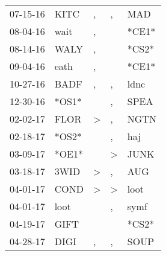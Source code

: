 \begin{supertabular}{p{0.07\textwidth}p{0.06\textwidth}p{0.02\textwidth}p{0.02\textwidth}p{0.06\textwidth}}
          07-15-16\textsuperscript{} &           KITC\textsuperscript{} &                , &                , &            MAD\textsuperscript{} \\
          08-04-16\textsuperscript{} &           wait\textsuperscript{} &                , &                  &                            *CE1* \\
          08-14-16\textsuperscript{} &           WALY\textsuperscript{} &                , &                  &                            *CS2* \\
          09-04-16\textsuperscript{} &           eath\textsuperscript{} &                , &                  &                            *CE1* \\
          10-27-16\textsuperscript{} &           BADF\textsuperscript{} &                , &                , &           ldnc\textsuperscript{} \\
          12-30-16\textsuperscript{} &                            *OS1* &                  &                , &           SPEA\textsuperscript{} \\
          02-02-17\textsuperscript{} &           FLOR\textsuperscript{} &     \textgreater &                , &           NGTN\textsuperscript{} \\
          02-18-17\textsuperscript{} &                            *OS2* &                  &                , &            haj\textsuperscript{} \\
          03-09-17\textsuperscript{} &                            *OE1* &                  &     \textgreater &           JUNK\textsuperscript{} \\
          03-18-17\textsuperscript{} &           3WID\textsuperscript{} &     \textgreater &                , &            AUG\textsuperscript{} \\
          04-01-17\textsuperscript{} &           COND\textsuperscript{} &     \textgreater &     \textgreater &           loot\textsuperscript{} \\
          04-01-17\textsuperscript{} &           loot\textsuperscript{} &                  &                , &           symf\textsuperscript{} \\
          04-19-17\textsuperscript{} &           GIFT\textsuperscript{} &                  &                  &                            *CS2* \\
          04-28-17\textsuperscript{} &           DIGI\textsuperscript{} &                , &                , &           SOUP\textsuperscript{} \\

\end{supertabular}
